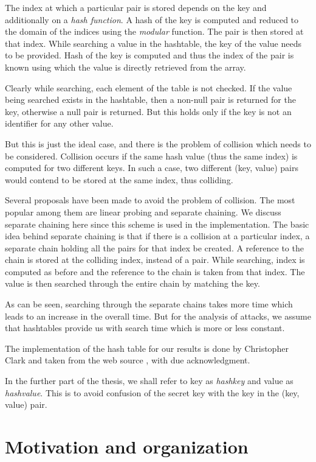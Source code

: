 The index at which a particular pair is stored depends on the key and additionally on a \textit{hash function}. A hash of the key is computed and reduced to the domain of the indices using the \textit{modular} function. The pair is then stored at that index. While searching a value in the hashtable, the key of the value needs to be provided. Hash of the key is computed and thus the index of the pair is known using which the value is directly retrieved from the array. 

Clearly while searching, each element of the table is not checked. If the value being searched exists in the hashtable, then a non-null pair is returned for the key, otherwise a null pair is returned. But this holds only if the key is not an identifier for any other value.

But this is just the ideal case, and there is the problem of collision which needs to be considered. Collision occurs if the same hash value (thus the same index) is computed for two different keys. In such a case, two different (key, value) pairs would contend to be stored at the same index, thus colliding. 

Several proposals have been made to avoid the problem of collision. The most popular among them are linear probing and separate chaining. We discuss separate chaining here since this scheme is used in the implementation. The basic idea behind separate chaining is that if there is a collision at a particular index, a separate chain holding all the pairs for that index be created. A reference to the chain is stored at the colliding index, instead of a pair. While searching, index is computed as before and the reference to the chain is taken from that index. The value is then searched through the entire chain by matching the key. 

As can be seen, searching through the separate chains takes more time which leads to an increase in the overall time. But for the analysis of attacks, we assume that hashtables provide us with search time which is more or less constant. 

The implementation of the hash table for our results is done by Christopher Clark and taken from the web source \cite{hash-table-impl}, with due acknowledgment. 

In the further part of the thesis, we shall refer to key as \textit{hashkey} and value as \textit{hashvalue}. This is to avoid confusion of the secret key with the key in the (key, value) pair. 

\section{Motivation and organization}

